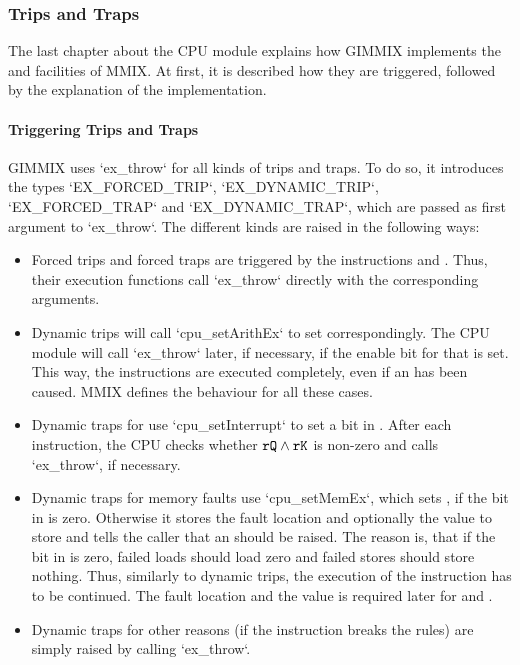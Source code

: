 \subsubsection{Trips and Traps}

The last chapter about the CPU module explains how GIMMIX implements the  and  facilities of MMIX. At first, it is described how they are triggered, followed by the explanation of the  implementation.

\paragraph{Triggering Trips and Traps}

GIMMIX uses `ex_throw` for all kinds of trips and traps. To do so, it introduces the types `EX_FORCED_TRIP`, `EX_DYNAMIC_TRIP`, `EX_FORCED_TRAP` and `EX_DYNAMIC_TRAP`, which are passed as first argument to `ex_throw`. The different kinds are raised in the following ways:
\begin{itemize}
	\item Forced trips and forced traps are triggered by the instructions  and . Thus, their execution functions call `ex_throw` directly with the corresponding arguments.
	\item Dynamic trips will call `cpu_setArithEx` to set  correspondingly. The CPU module will call `ex_throw` later, if necessary, \ie if the enable bit for that  is set. This way, the instructions are executed completely, even if an  has been caused. MMIX defines the behaviour for all these cases.
	\item Dynamic traps for  use `cpu_setInterrupt` to set a bit in . After each instruction, the CPU checks whether ${\tt rQ} \land {\tt rK}$ is non-zero and calls `ex_throw`, if necessary.
	\item Dynamic traps for memory faults use `cpu_setMemEx`, which sets , if the bit in  is zero. Otherwise it stores the fault location and optionally the value to store and tells the caller that an  should be raised. The reason is, that if the bit in  is zero, failed loads should load zero and failed stores should store nothing. Thus, similarly to dynamic trips, the execution of the instruction has to be continued. The fault location and the value is required later for  and .
	\item Dynamic traps for other reasons (\eg if the instruction breaks the rules) are simply raised by calling `ex_throw`.
\end{itemize}
